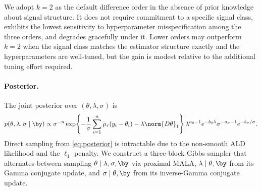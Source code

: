 We adopt $k = 2$ as the default difference order in the absence of prior knowledge about signal structure. It does not require commitment to a specific signal class, exhibits the lowest sensitivity to hyperparameter misspecification among the three orders, and degrades gracefully under it. Lower orders may outperform $k = 2$ when the signal class matches the estimator structure exactly and the hyperparameters are well-tuned, but the gain is modest relative to the additional tuning effort required.

\paragraph{Posterior.}
The joint posterior over $(\theta, \lambda, \sigma)$ is
\begin{equation}
    p(\theta, \lambda, \sigma \mid \by) \propto
    \sigma^{-n}
    \exp\!\left\{-\frac{1}{\sigma}\sum_{i=1}^n \rho_\tau(y_i - \theta_i)
    - \lambda \norm{D\theta}_1\right\}
    \lambda^{a_0 - 1} e^{-b_0 \lambda}
    \sigma^{-a_\sigma - 1} e^{-b_\sigma / \sigma}.
    \label{eq:posterior}
\end{equation}
Direct sampling from \eqref{eq:posterior} is intractable due to the non-smooth ALD likelihood and the $\ell_1$ penalty. We construct a three-block Gibbs sampler that alternates between sampling $\theta \mid \lambda, \sigma, \by$ via proximal MALA, $\lambda \mid \theta, \by$ from its Gamma conjugate update, and $\sigma \mid \theta, \by$ from its inverse-Gamma conjugate update.

